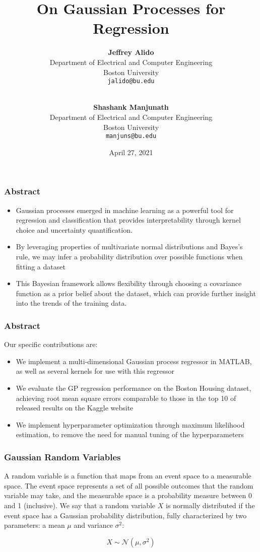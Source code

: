 \documentclass[pdf]{beamer}
\title{On Gaussian Processes for Regression}
\author{
  \textbf{Jeffrey Alido} \\
  Department of Electrical and Computer Engineering \\
  Boston University \\
  \texttt{jalido@bu.edu} \\
  \and \\
  \textbf{Shashank Manjunath} \\
  Department of Electrical and Computer Engineering \\
  Boston University \\
  \texttt{manjuns@bu.edu}
}
\date{April 27, 2021}
\begin{document}
\begin{frame}
  \titlepage
\end{frame}

\begin{frame}
  \frametitle{Abstract}
  \begin{itemize}
    \item Gaussian processes emerged in machine learning as a powerful tool for regression and classification that
      provides interpretability through kernel choice and uncertainty quantification.
    \item By leveraging properties of multivariate normal distributions and Bayes’s rule, we may infer a probability
      distribution over possible functions when fitting a dataset
    \item This Bayesian framework allows flexibility through choosing a covariance function as a prior belief about the
      dataset, which can provide further insight into the trends of the training data. 
  \end{itemize}
\end{frame}

\begin{frame}
  \frametitle{Abstract}
  Our specific contributions are:
  \begin{itemize}
    \item We implement a multi-dimensional Gaussian process regressor in MATLAB, as well as several kernels for use with
      this regressor
    \item We evaluate the GP regression performance on the Boston Housing dataset, achieving root mean square errors
      comparable to those in the top 10 of released results on the Kaggle website
    \item We implement hyperparameter optimization through maximum likelihood estimation, to remove the need for
      manual tuning of the hyperparameters
  \end{itemize}
\end{frame}

\begin{frame}
  \frametitle{Gaussian Random Variables}

A random variable is a function that maps from an event space to a measurable space. The event space represents a set of
all possible outcomes that the random variable may take, and the measurable space is a probability measure between 0 and
1 (inclusive). We say that a random variable $X$ is normally distributed if the event space has a Gaussian probability
distribution, fully characterized by two parameters: a mean $\mu$ and variance $\sigma^2$:

\[
  X\sim \mathcal{N}(\mu,\sigma^2)
\]

\end{frame}
\end{document}

